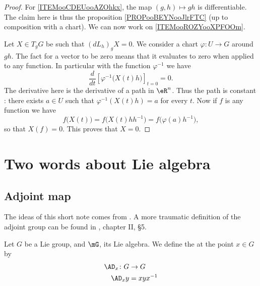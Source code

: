 \begin{proof}
	For \ref{ITEMooCDEUooAZOhkx}, the map \( (g,h)\mapsto gh\) is differentiable. The claim here is thus the proposition \ref{PROPooBEYNooJlrFTC} (up to composition with a chart). We can now work on \ref{ITEMooROZYooXPFOOm}.

	Let \( X\in T_gG\) be such that \( (dL_h)_gX=0\). We consider a chart \(\varphi \colon U\to G  \) around \( gh\). The fact for a vector to be zero means that it evaluates to zero when applied to any function. In particular with the function \( \varphi^{-1}\) we have
	\begin{equation}
		\frac{d}{dt} \left[ \varphi^{-1}\big( X(t)h \big)  \right]_{t=0}=0.
	\end{equation}
	The derivative here is the derivative of a path in \( \eR^n\). Thus the path is constant : there exists \( a\in U \) such that \( \varphi^{-1}(X(t)h)=a\) for every \( t\). Now if \( f\) is any function we have
	\begin{equation}
		f\big( X(t) \big)=f\big( X(t)hh^{-1} \big)=f\big( \varphi(a)h^{-1} \big),
	\end{equation}
	so that \( X(f)=0\). This proves that \( X=0\).
\end{proof}


\section{Two words about Lie algebra}


\subsection{Adjoint map}

The ideas of this short note comes from \cite{Lie}. A more traumatic definition of the adjoint group can be found in \cite{Helgason}, chapter II, \S 5.

\begin{definition}
	Let $G$ be a Lie group, and $\mG$, its Lie algebra. We define the  at the point $x\in G$ by
	\begin{equation}
		\begin{aligned}
			\AD_x\colon G & \to G     \\
			\AD_xy        & =xyx^{-1}
		\end{aligned}
	\end{equation}
\end{definition}

